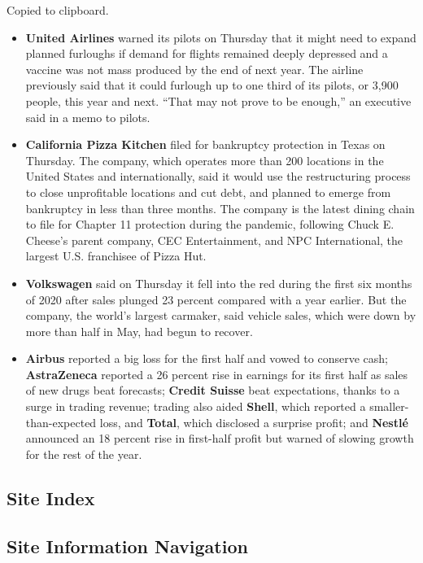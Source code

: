 Copied to clipboard.

\begin{itemize}
\item
  \textbf{United Airlines} warned its pilots on Thursday that it might
  need to expand planned furloughs if demand for flights remained deeply
  depressed and a vaccine was not mass produced by the end of next year.
  The airline previously said that it could furlough up to one third of
  its pilots, or 3,900 people, this year and next. ``That may not prove
  to be enough,'' an executive said in a memo to pilots.
\item
  \textbf{California Pizza Kitchen} filed for bankruptcy protection in
  Texas on Thursday. The company, which operates more than 200 locations
  in the United States and internationally, said it would use the
  restructuring process to close unprofitable locations and cut debt,
  and planned to emerge from bankruptcy in less than three months. The
  company is the latest dining chain to file for Chapter 11 protection
  during the pandemic, following Chuck E. Cheese's parent company, CEC
  Entertainment, and NPC International, the largest U.S. franchisee of
  Pizza Hut.
\item
  \textbf{Volkswagen} said on Thursday it fell into the red during the
  first six months of 2020 after sales plunged 23 percent compared with
  a year earlier. But the company, the world's largest carmaker, said
  vehicle sales, which were down by more than half in May, had begun to
  recover.
\item
  \textbf{Airbus} reported a big loss for the first half and vowed to
  conserve cash; \textbf{AstraZeneca} reported a 26 percent rise in
  earnings for its first half as sales of new drugs beat forecasts;
  \textbf{Credit Suisse} beat expectations, thanks to a surge in trading
  revenue; trading also aided \textbf{Shell}, which reported a
  smaller-than-expected loss, and \textbf{Total}, which disclosed a
  surprise profit; and \textbf{Nestlé} announced an 18 percent rise in
  first-half profit but warned of slowing growth for the rest of the
  year.
\end{itemize}

\hypertarget{site-index}{%
\subsection{Site Index}\label{site-index}}

\hypertarget{site-information-navigation}{%
\subsection{Site Information
Navigation}\label{site-information-navigation}}

